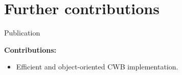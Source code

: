 \documentclass[t,10pt]{beamer}
\begin{document}


\section{Further contributions}

\begin{frame}{Publication \citep{schalk2018compboost}}
  \vspace{-0.2cm}
  \begin{figure}
    \centering
  \end{figure}
  \vspace{-0.2cm}
  \textbf{Contributions:}
  \begin{itemize}
    \item
      Efficient and object-oriented CWB implementation.
  \end{itemize}
\end{frame}
\end{document}
